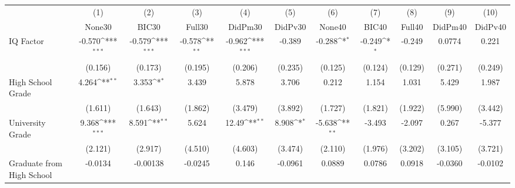 {
\def\sym#1{\ifmmode^{#1}\else\(^{#1}\)\fi}
\begin{tabular}{l*{10}{c}}
\toprule
            &\multicolumn{1}{c}{(1)}&\multicolumn{1}{c}{(2)}&\multicolumn{1}{c}{(3)}&\multicolumn{1}{c}{(4)}&\multicolumn{1}{c}{(5)}&\multicolumn{1}{c}{(6)}&\multicolumn{1}{c}{(7)}&\multicolumn{1}{c}{(8)}&\multicolumn{1}{c}{(9)}&\multicolumn{1}{c}{(10)}\\
            &\multicolumn{1}{c}{None30}&\multicolumn{1}{c}{BIC30}&\multicolumn{1}{c}{Full30}&\multicolumn{1}{c}{DidPm30}&\multicolumn{1}{c}{DidPv30}&\multicolumn{1}{c}{None40}&\multicolumn{1}{c}{BIC40}&\multicolumn{1}{c}{Full40}&\multicolumn{1}{c}{DidPm40}&\multicolumn{1}{c}{DidPv40}\\
\midrule
IQ Factor   &      -0.570\sym{***}&      -0.579\sym{***}&      -0.578\sym{**} &      -0.962\sym{***}&      -0.389         &      -0.288\sym{*}  &      -0.249\sym{*}  &      -0.249         &      0.0774         &       0.221         \\
            &     (0.156)         &     (0.173)         &     (0.195)         &     (0.206)         &     (0.235)         &     (0.125)         &     (0.124)         &     (0.129)         &     (0.271)         &     (0.249)         \\
\addlinespace
High School Grade&       4.264\sym{**} &       3.353\sym{*}  &       3.439         &       5.878         &       3.706         &       0.212         &       1.154         &       1.031         &       5.429         &       1.987         \\
            &     (1.611)         &     (1.643)         &     (1.862)         &     (3.479)         &     (3.892)         &     (1.727)         &     (1.821)         &     (1.922)         &     (5.990)         &     (3.442)         \\
\addlinespace
University Grade&       9.368\sym{***}&       8.591\sym{**} &       5.624         &       12.49\sym{**} &       8.908\sym{*}  &      -5.638\sym{**} &      -3.493         &      -2.097         &       0.267         &      -5.377         \\
            &     (2.121)         &     (2.917)         &     (4.510)         &     (4.603)         &     (3.474)         &     (2.110)         &     (1.976)         &     (3.202)         &     (3.105)         &     (3.721)         \\
\addlinespace
Graduate from High School&     -0.0134         &    -0.00138         &     -0.0245         &       0.146         &     -0.0961         &      0.0889         &      0.0786         &      0.0918         &     -0.0360         &     -0.0102         \\

\end{tabular}}
